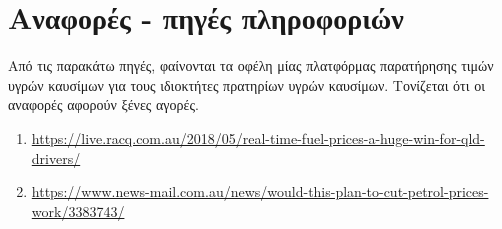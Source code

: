 \section{Αναφορές - πηγές πληροφοριών}

Από τις παρακάτω πηγές, φαίνονται τα οφέλη μίας πλατφόρμας παρατήρησης τιμών υγρών καυσίμων για τους ιδιοκτήτες πρατηρίων υγρών καυσίμων. Τονίζεται ότι οι αναφορές αφορούν ξένες αγορές.
\begin{enumerate}
	\item \href{https://live.racq.com.au/2018/05/real-time-fuel-prices-a-huge-win-for-qld-drivers/}{https://live.racq.com.au/2018/05/real-time-fuel-prices-a-huge-win-for-qld-drivers/}
	\item \href{https://www.news-mail.com.au/news/would-this-plan-to-cut-petrol-prices-work/3383743/}{https://www.news-mail.com.au/news/would-this-plan-to-cut-petrol-prices-work/3383743/}
\end{enumerate}
